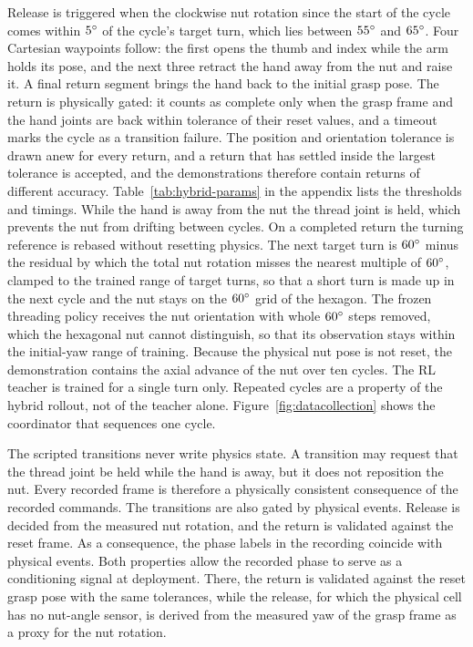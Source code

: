 Release is triggered when the clockwise nut rotation since the start of the cycle comes within $5^\circ$ of the cycle's target turn, which lies between $55^\circ$ and $65^\circ$. Four Cartesian waypoints follow: the first opens the thumb and index while the arm holds its pose, and the next three retract the hand away from the nut and raise it. A final return segment brings the hand back to the initial grasp pose. The return is physically gated: it counts as complete only when the grasp frame and the hand joints are back within tolerance of their reset values, and a timeout marks the cycle as a transition failure. The position and orientation tolerance is drawn anew for every return, and a return that has settled inside the largest tolerance is accepted, and the demonstrations therefore contain returns of different accuracy. Table~\ref{tab:hybrid-params} in the appendix lists the thresholds and timings. While the hand is away from the nut the thread joint is held, which prevents the nut from drifting between cycles. On a completed return the turning reference is rebased without resetting physics. The next target turn is $60^\circ$ minus the residual by which the total nut rotation misses the nearest multiple of $60^\circ$, clamped to the trained range of target turns, so that a short turn is made up in the next cycle and the nut stays on the $60^\circ$ grid of the hexagon. The frozen threading policy receives the nut orientation with whole $60^\circ$ steps removed, which the hexagonal nut cannot distinguish, so that its observation stays within the initial-yaw range of training. Because the physical nut pose is not reset, the demonstration contains the axial advance of the nut over ten cycles. The \ac{RL} teacher is trained for a single turn only. Repeated cycles are a property of the hybrid rollout, not of the teacher alone. Figure~\ref{fig:datacollection} shows the coordinator that sequences one cycle.

The scripted transitions never write physics state. A transition may request that the thread joint be held while the hand is away, but it does not reposition the nut. Every recorded frame is therefore a physically consistent consequence of the recorded commands. The transitions are also gated by physical events. Release is decided from the measured nut rotation, and the return is validated against the reset frame. As a consequence, the phase labels in the recording coincide with physical events. Both properties allow the recorded phase to serve as a conditioning signal at deployment. There, the return is validated against the reset grasp pose with the same tolerances, while the release, for which the physical cell has no nut-angle sensor, is derived from the measured yaw of the grasp frame as a proxy for the nut rotation.

